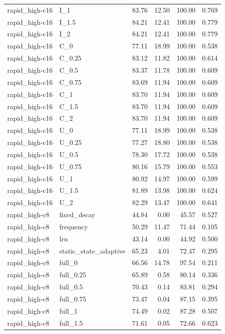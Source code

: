 \begin{longtable}{llrrrr}
rapid\_high-c16 & I\_1 & 83.76 & 12.50 & 100.00 & 0.769\\
rapid\_high-c16 & I\_1.5 & 84.21 & 12.41 & 100.00 & 0.779\\
rapid\_high-c16 & I\_2 & 84.21 & 12.41 & 100.00 & 0.779\\
rapid\_high-c16 & C\_0 & 77.11 & 18.99 & 100.00 & 0.538\\
rapid\_high-c16 & C\_0.25 & 83.12 & 11.82 & 100.00 & 0.614\\
rapid\_high-c16 & C\_0.5 & 83.37 & 11.78 & 100.00 & 0.609\\
rapid\_high-c16 & C\_0.75 & 83.69 & 11.94 & 100.00 & 0.609\\
rapid\_high-c16 & C\_1 & 83.70 & 11.94 & 100.00 & 0.609\\
rapid\_high-c16 & C\_1.5 & 83.70 & 11.94 & 100.00 & 0.609\\
rapid\_high-c16 & C\_2 & 83.70 & 11.94 & 100.00 & 0.609\\
rapid\_high-c16 & U\_0 & 77.11 & 18.99 & 100.00 & 0.538\\
rapid\_high-c16 & U\_0.25 & 77.27 & 18.80 & 100.00 & 0.538\\
rapid\_high-c16 & U\_0.5 & 78.30 & 17.72 & 100.00 & 0.538\\
rapid\_high-c16 & U\_0.75 & 80.16 & 15.79 & 100.00 & 0.553\\
rapid\_high-c16 & U\_1 & 80.92 & 14.97 & 100.00 & 0.599\\
rapid\_high-c16 & U\_1.5 & 81.89 & 13.98 & 100.00 & 0.624\\
rapid\_high-c16 & U\_2 & 82.29 & 13.47 & 100.00 & 0.641\\
rapid\_high-c8 & fixed\_decay & 44.84 & 0.00 & 45.57 & 0.527\\
rapid\_high-c8 & frequency & 50.29 & 11.47 & 71.44 & 0.105\\
rapid\_high-c8 & lru & 43.14 & 0.00 & 44.92 & 0.500\\
rapid\_high-c8 & static\_state\_adaptive & 65.23 & 4.01 & 72.47 & 0.295\\
rapid\_high-c8 & full\_0 & 66.56 & 14.78 & 97.54 & 0.211\\
rapid\_high-c8 & full\_0.25 & 65.89 & 0.58 & 80.14 & 0.336\\
rapid\_high-c8 & full\_0.5 & 70.43 & 0.14 & 83.81 & 0.294\\
rapid\_high-c8 & full\_0.75 & 73.47 & 0.04 & 87.15 & 0.395\\
rapid\_high-c8 & full\_1 & 74.49 & 0.02 & 87.28 & 0.507\\
rapid\_high-c8 & full\_1.5 & 71.61 & 0.05 & 72.66 & 0.623\\

\end{longtable}
